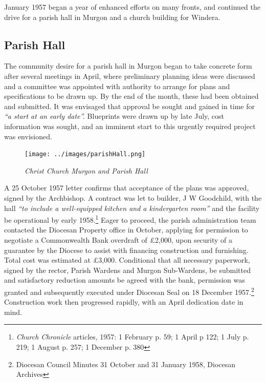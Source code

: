 January 1957 began a year of enhanced efforts on many fronts, and continued the drive for a parish hall in Murgon and a church building for Windera.



\subsection{Parish Hall}



The community desire for a parish hall in Murgon began to take concrete form after several meetings in April, where preliminary planning ideas were discussed and a committee was appointed with authority to arrange for plans and specifications to be drawn up. By the end of the month, these had been obtained and submitted. It was envisaged that approval be sought and gained in time for \emph{``a start at an early date''.} Blueprints were drawn up by late July, cost information was sought, and an imminent start to this urgently required project was envisioned.









\begin{figure}[!htb]
\begin{center}
\texttt{[image: ../images/parishHall.png]}
\caption{\itshape Christ Church Murgon and Parish Hall}
\end{center}
\end{figure}




A 25 October 1957 letter confirms that acceptance of the plans was approved, signed by the Archbishop. A contract was let to builder, J W Goodchild, with the hall \emph{``to include a well-equipped kitchen and a kindergarten room''} and the facility be operational by early 1958.\footnote{\emph{Church Chronicle} articles, 1957: 1 February p. 59; 1 April p 122; 1 July p. 219; 1 August p. 257; 1 December p. 380} Eager to proceed, the parish administration team contacted the Diocesan Property office in October, applying for permission to negotiate a Commonwealth Bank overdraft of \pounds2,000, upon security of a guarantee by the Diocese to assist with financing construction and furnishing. Total cost was estimated at \pounds3,000. Conditional that all necessary paperwork, signed by the rector, Parish Wardens and Murgon Sub-Wardens, be submitted and satisfactory reduction amounts be agreed with the bank, permission was granted and subsequently executed under Diocesan Seal on 18 December 1957.\footnote{Diocesan Council Minutes 31 October and 31 January 1958, Diocesan Archives} Construction work then progressed rapidly, with an April dedication date in mind.


